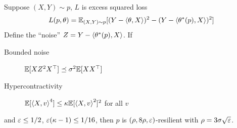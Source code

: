 \begin{proposition}
  Suppose $(X, Y) \sim p$, $L$ is excess squared loss
  \begin{align}
    L(p, \theta) = \mathbb{E}_{(X,Y) \sim p}[(Y - \braket{\theta, X})^2 - (Y - \braket{\theta^*(p), X})^2]
  \end{align}
  Define the ``noise'' $Z = Y - \braket{\theta^*(p), X}$.
  If
  \begin{description}
    \item[Bounded noise] $\mathbb{E}[X Z^2 X^\top] \preceq \sigma^2 \mathbb{E}[X X^\top]$
    \item[Hypercontractivity] $\mathbb{E}[\braket{X, v}^4] \leq \kappa \mathbb{E}[\braket{X, v}^2]^2$ for all $v$
  \end{description}
  and $\varepsilon \leq 1/2$, $\varepsilon(\kappa - 1) \leq 1 / 16$, then $p$
  is $(\rho, 8\rho, \varepsilon)$-resilient with $\rho = 3 \sigma \sqrt{\varepsilon}$.
\end{proposition}


